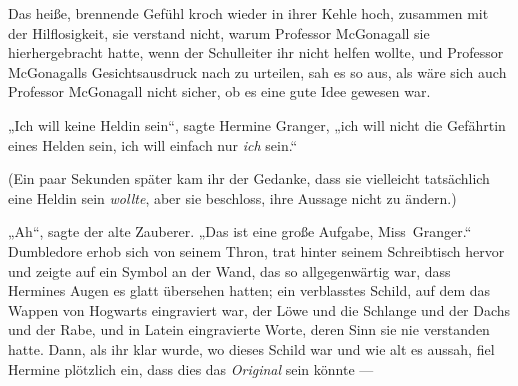Das heiße, brennende Gefühl kroch wieder in ihrer Kehle hoch, zusammen mit der Hilflosigkeit, sie verstand nicht, warum Professor McGonagall sie hierhergebracht hatte, wenn der Schulleiter ihr nicht helfen wollte, und Professor McGonagalls Gesichtsausdruck nach zu urteilen, sah es so aus, als wäre sich auch Professor McGonagall nicht sicher, ob es eine gute Idee gewesen war.

„Ich will keine Heldin sein“, sagte Hermine Granger, „ich will nicht die Gefährtin eines Helden sein, ich will einfach nur \emph{ich} sein.“

(Ein paar Sekunden später kam ihr der Gedanke, dass sie vielleicht tatsächlich eine Heldin sein \emph{wollte}, aber sie beschloss, ihre Aussage nicht zu ändern.)

„Ah“, sagte der alte Zauberer.
„Das ist eine große Aufgabe, Miss~Granger.“ Dumbledore erhob sich von seinem Thron, trat hinter seinem Schreibtisch hervor und zeigte auf ein Symbol an der Wand, das so allgegenwärtig war, dass Hermines Augen es glatt übersehen hatten; ein verblasstes Schild, auf dem das Wappen von Hogwarts eingraviert war, der Löwe und die Schlange und der Dachs und der Rabe, und in Latein eingravierte Worte, deren Sinn sie nie verstanden hatte. Dann, als ihr klar wurde, wo dieses Schild war und wie alt es aussah, fiel Hermine plötzlich ein, dass dies das \emph{Original} sein könnte —

